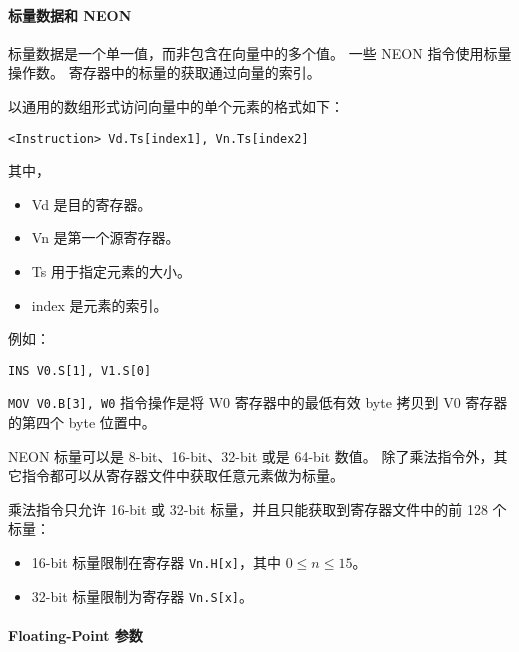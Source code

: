 
\paragraph{标量数据和 NEON}

标量数据是一个单一值，而非包含在向量中的多个值。
一些 NEON 指令使用标量操作数。
寄存器中的标量的获取通过向量的索引。

以通用的数组形式访问向量中的单个元素的格式如下：

\lstinline!<Instruction> Vd.Ts[index1], Vn.Ts[index2]!

其中，

\begin{itemize}
  \item[] Vd 是目的寄存器。
  \item[] Vn 是第一个源寄存器。
  \item[] Ts 用于指定元素的大小。
  \item[] index 是元素的索引。
\end{itemize}

例如：

\lstinline[language={[ARM]Assembler}]!INS V0.S[1], V1.S[0]!


\lstinline!MOV V0.B[3], W0! 指令操作是将 W0 寄存器中的最低有效 byte 拷贝到 V0 寄存器的第四个 byte 位置中。


NEON 标量可以是 8-bit、16-bit、32-bit 或是 64-bit 数值。
除了乘法指令外，其它指令都可以从寄存器文件中获取任意元素做为标量。

乘法指令只允许 16-bit 或 32-bit 标量，并且只能获取到寄存器文件中的前 128 个标量：

\begin{itemize}
  \item 16-bit 标量限制在寄存器 \lstinline!Vn.H[x]!，其中 $0 \leq n \leq 15$。
  \item 32-bit 标量限制为寄存器 \lstinline!Vn.S[x]!。
\end{itemize}

\paragraph{Floating-Point 参数}


